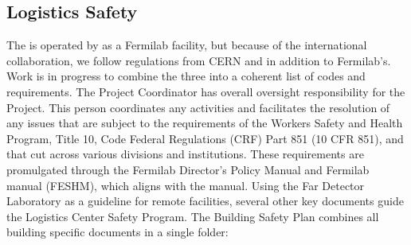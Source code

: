 \subsection{Logistics Safety}
\label{sec:fdsp-tc-log-safety}


The   is operated by   as a Fermilab facility, but because of the international collaboration, we  follow  regulations from CERN and  in addition to Fermilab's.  Work is in progress to combine the three into a coherent list of codes and requirements. The  Project  Coordinator has overall  oversight responsibility for the  Project.  This person coordinates any  activities and facilitates the resolution of any issues that are subject to the requirements of the  Workers Safety and Health Program, Title 10, Code Federal Regulations (CRF) Part 851 (10 CFR 851), and that cut across various divisions  and institutions. These requirements are promulgated through the Fermilab Director's Policy Manual  and Fermilab  manual (FESHM\cite{feshm}), which aligns with the   manual.  Using the  Far Detector Laboratory as a guideline for remote facilities, several other key documents guide the Logistics Center Safety Program.  The Building Safety Plan  combines all building specific documents in a single folder:

